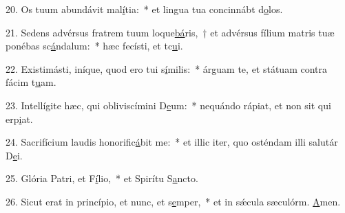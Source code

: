 20. Os tuum abundávit mal\uline{í}tia:~* et lingua tua concinnábt d\uline{o}los.\par 
21. Sedens advérsus fratrem tuum loque\uline{bá}ris,~† et advérsus fílium matris tuæ ponébas sc\uline{á}ndalum:~* hæc fecísti, et tc\uline{u}i.\par 
22. Existimásti, iníque, quod ero tui s\uline{í}milis:~* árguam te, et státuam contra fácim t\uline{u}am.\par 
23. Intellígite hæc, qui obliviscímini D\uline{e}um:~* nequándo rápiat, et non sit qui erp\uline{i}at.\par 
24. Sacrifícium laudis honorific\uline{á}bit me:~* et illic iter, quo osténdam illi salutár D\uline{e}i.\par 
25. Glória Patri, et F\uline{í}lio,~* et Spirítu S\uline{a}ncto.\par 
26. Sicut erat in princípio, et nunc, et s\uline{e}mper,~* et in sǽcula sæculórm. \uline{A}men.\par 
